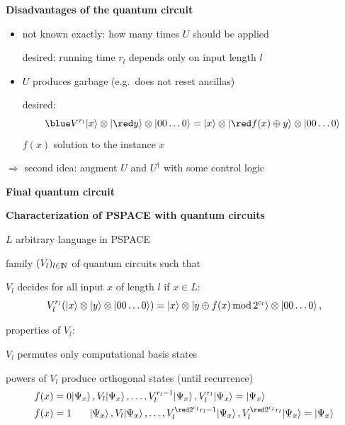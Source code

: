 \documentclass[portrait]{seminar}
\newcommand{\ket}[1]{|#1\rangle}
\begin{document}
\begin{slide}
{\bf {\large Disadvantages of the quantum circuit}}
\begin{itemize}
\item not known exactly: how many times $U$ should be applied 

desired: running time $r_l$ depends only on input length $l$
\item $U$ produces garbage (e.g.\ does not reset ancillas)

desired: 
\[
{\blue 
V^{r_l}\ket{x}\otimes\ket{{\red y}}\otimes\ket{00\ldots 0}=
\ket{x}\otimes\ket{{\red f(x)\oplus y}}\otimes\ket{00\ldots 0}
}
\]
\hspace{1.5cm}$f(x)$ solution to the instance $x$
\end{itemize}

\vspace{0.25cm}
$\Longrightarrow$ second idea: augment $U$ and $U^\dagger$ with some
control logic

\medskip
\centerline{\textwidth{}}

\end{slide}

\begin{slide*}
{\bf Final quantum circuit}

\bigskip
\centerline{\textwidth{}}
\end{slide*}

\begin{slide}
{\bf {\large Characterization of PSPACE with quantum circuits}}

$L$ arbitrary language in PSPACE 

\hspace{2cm}{\Large $\Downarrow$}

family $(V_l)_{l\in\N}$ of quantum circuits such that

\quad $V_l$ decides for all input $x$ of length $l$ if $x\in L$:
\[
V_l^{r_l} (\ket{x} \otimes \ket{y} \otimes \ket{00\dots 0}) =
\ket{x} \otimes \ket{y \oplus f(x)\, {\rm mod}\, 2^{c_l}} 
\otimes \ket{00\dots 0}\,,
\]

\quad properties of $V_l$:

\quad\quad $V_l$ permutes only computational basis states

\quad\quad powers of $V_l$ produce orthogonal states (until recurrence)
\begin{eqnarray*}
f(x)=0 &
\ket{\Psi_x}\,,V_l\ket{\Psi_x}\,,\ldots,
V_l^{r_l-1}\ket{\Psi_x}\,,V_l^{r_l}\ket{\Psi_x}=\ket{\Psi_x} \\
f(x)=1 & 
{}\,\,\,\,\,\,\,\,\,\,\,\ket{\Psi_x}\,,V_l\ket{\Psi_x}\,,\ldots,
V_l^{{\red 2^{c_l}} r_l-1}\ket{\Psi_x}\,,V_l^{{\red 2^{c_l}} r_l}\ket{\Psi_x}=\ket{\Psi_x}
\end{eqnarray*}
\quad{}
\end{slide}
\end{document}
